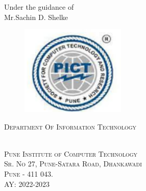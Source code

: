 \documentclass[12pt,a4paper]{report}     %
\begin{document}
	\begin{center}
	    {Under the guidance of }\\
	    {Mr.Sachin D. Shelke}  %
	\end{center}

		\vspace{0.1in}

	\begin{center}
	  \begin{figure}[h]
			\centering
			\includegraphics[width=5cm]{pict_logo.png}
		\end{figure}
		\vspace{0.1cm}
	  \begin{large}\textsc {Department Of Information Technology} \end{large}\\
	  \textsc{Pune Institute of Computer Technology}\\
	  \textsc{Sr. No 27, Pune-Satara Road, Dhankawadi}\\
	  \textsc{Pune - 411 043.}\\
	      AY: 2022-2023
	\end{center}

\newpage
\pagestyle{plain}
\pagestyle{empty}
\pagestyle{fancy}							%
\renewcommand{\headrulewidth}{0pt}

		
\end{document}
